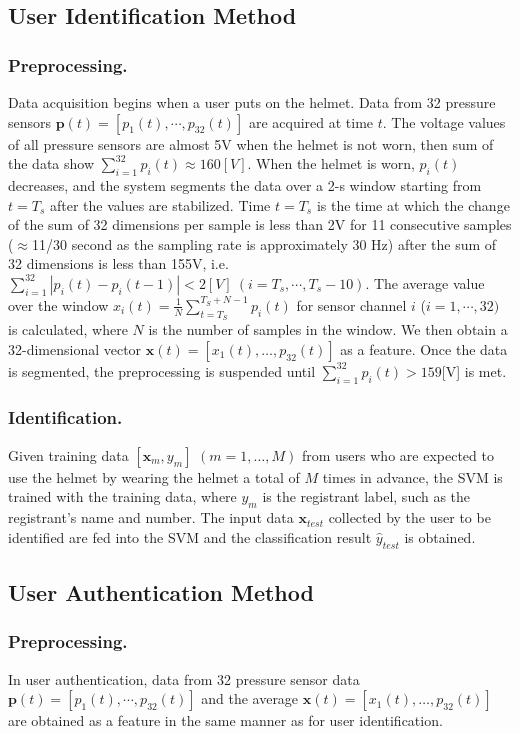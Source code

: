 \documentclass[english,preprint,JIP]{ipsj}
\begin{document}
\subsection{User Identification Method}


\subsubsection{Preprocessing.}
Data acquisition begins when a user puts on the helmet. Data from 32 pressure sensors $\bm{p}(t)=[p_1(t),\cdots,p_{32}(t)]$ are acquired at time $t$. The voltage values of all pressure sensors are almost 5V when the helmet is not worn, then sum of the data show $\sum_{i=1}^{32}p_i(t)\approx160[V]$. When the helmet is worn, $p_i(t)$ decreases, and the system segments the data over a 2-s window starting from $t=T_s$ after the values are stabilized. Time $t=T_s$ is the time at which the change of the sum of 32 dimensions per sample is less than 2V for 11 consecutive samples ($\approx$11/30 second as the sampling rate is approximately 30 Hz) after the sum of 32 dimensions is less than 155V, i.e. $\sum_{i=1}^{32}|p_i(t)-p_i(t-1)|<2[V]~(i=T_s,\cdots,T_s-10)$. The average value over the window $x_i(t)=\frac{1}{N}\sum_{t=T_S}^{T_S+N-1}p_i(t)$ for sensor channel $i$ ($i=1,\cdots,32)$ is calculated, where $N$ is the number of samples in the window. We then obtain a 32-dimensional vector $\bm{x}(t)=[x_{1}(t),\dots,p_{32}(t)]$ as a feature. Once the data is segmented, the preprocessing is suspended until $\sum_{i=1}^{32}p_i(t)>159$[V] is met.


\subsubsection{Identification.}
Given training data $[\bm{x}_m,y_m]$ $(m=1,\dots, M)$ from users who are expected to use the helmet by wearing the helmet a total of $M$ times in advance, the SVM is trained with the training data, where $y_m$ is the registrant label, such as the registrant's name and number. The input data $\bm{x}_{test}$ collected by the user to be identified are fed into the SVM and the classification result $\hat{y}_{test}$ is obtained.


\subsection{User Authentication Method}


\subsubsection{Preprocessing.}
In user authentication, data from 32 pressure sensor data $\bm{p}(t)=[p_1(t),\cdots,p_{32}(t)]$ and the average $\bm{x}(t)=[x_{1}(t),\dots,p_{32}(t)]$ are obtained as a feature in the same manner as for user identification.
\end{document}
